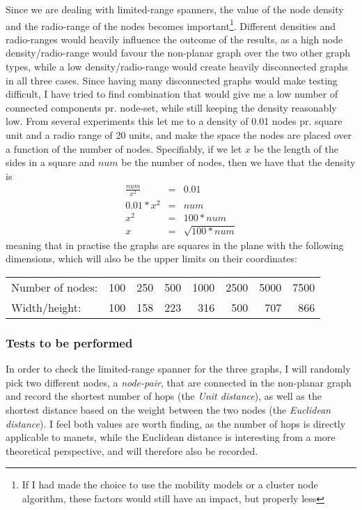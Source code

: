 Since we are dealing with limited-range spanners, the value of the node density and the radio-range of the nodes becomes important\footnote{If I had made the choice to use the mobility models or a cluster node algorithm, these factors would still have an impact, but properly less}. Different densities and radio-ranges would heavily influence the outcome of the results, as a high node density/radio-range would favour the non-planar graph over the two other graph types, while a low density/radio-range would create heavily disconnected graphs in all three cases. Since having many disconnected graphs would make testing difficult, I have tried to find combination that would give me a low number of connected components pr. node-set, while still keeping the density reasonably low. From several experiments this let me to a density of 0.01 nodes pr. square unit and a radio range of 20 units, and make the space the nodes are placed over a function of the number of nodes. Specifiably, if we let $x$ be the length of the sides in a square and $num$ be the number of nodes, then we have that the density is
\begin{eqnarray}
\frac{num}{x^2} &=& 0.01 \\
0.01 * x^2 &=& num \\
x^2 &=& 100 * num\\
x &=& \sqrt{100 * num}  
\end{eqnarray}
meaning that in practise the graphs are squares in the plane with the following dimensions, which will also be the upper limits on their coordinates:

\begin{tabular}{lrrrrrrr}
Number of nodes: & 100 & 250 & 500 & 1000 & 2500 & 5000 & 7500 \\
Width/height:    & 100 & 158 & 223 &  316 &  500 &  707 &  866  
\end{tabular} 

\subsubsection{Tests to be performed}
\label{section:spanner_tests_performed}
In order to check the limited-range spanner for the three graphs, I will randomly pick two different nodes, a \emph{node-pair}, that are connected in the non-planar graph and record the shortest number of hops (the \emph{Unit distance}), as well as the shortest distance based on the weight between the two nodes (the \emph{Euclidean distance}). I feel both values are worth finding, as the number of hops is directly applicable to \acp{manet}, while the Euclidean distance is interesting from a more theoretical perspective, and will therefore also be recorded.

